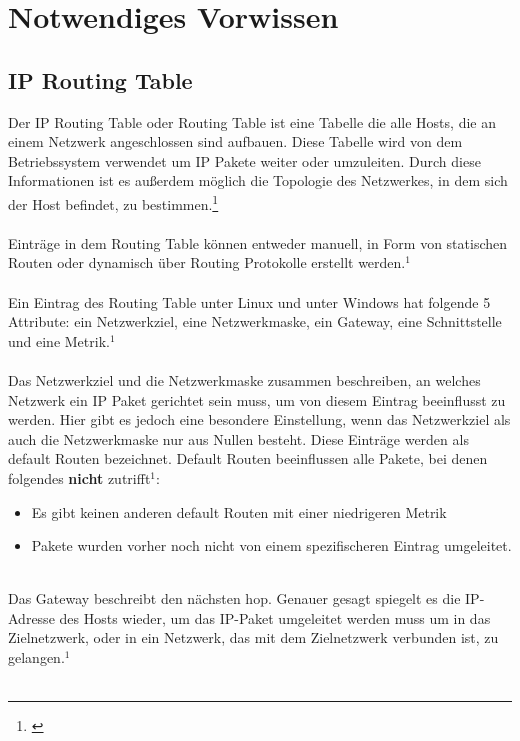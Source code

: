 \chapter{Notwendiges Vorwissen}
\label{cha:Notwendiges Vorwissen}

\section{IP Routing Table}
Der IP Routing Table oder Routing Table ist eine Tabelle die alle Hosts, die an einem Netzwerk angeschlossen sind aufbauen. Diese Tabelle wird von dem Betriebssystem verwendet um IP Pakete weiter oder umzuleiten. Durch diese Informationen ist es außerdem möglich die Topologie des Netzwerkes, in dem sich der Host befindet, zu bestimmen.\footnote[1]{\cite[Vgl.][]{2}}
\\\\
Einträge in dem Routing Table können entweder manuell, in Form von statischen Routen oder dynamisch über Routing Protokolle erstellt werden.$^{1}$
\\\\
Ein Eintrag des Routing Table unter Linux und unter Windows hat folgende 5 Attribute: ein Netzwerkziel, eine Netzwerkmaske, ein Gateway, eine Schnittstelle und eine Metrik.$^{1}$
\\\\
Das Netzwerkziel und die Netzwerkmaske zusammen beschreiben, an welches Netzwerk ein IP Paket gerichtet sein muss, um von diesem Eintrag beeinflusst zu werden. Hier gibt es jedoch eine besondere Einstellung, wenn das Netzwerkziel als auch die Netzwerkmaske nur aus Nullen besteht. Diese Einträge werden als default Routen bezeichnet. Default Routen beeinflussen alle Pakete, bei denen folgendes \textbf{nicht} zutrifft$^{1}$: 
\\
\begin{itemize}
    \item Es gibt keinen anderen default Routen mit einer niedrigeren Metrik
    \item Pakete wurden vorher noch nicht von einem spezifischeren Eintrag umgeleitet.
\end{itemize}
\ \\
Das Gateway beschreibt den nächsten hop. Genauer gesagt spiegelt es die IP-Adresse des Hosts wieder, um das IP-Paket umgeleitet werden muss um in das Zielnetzwerk, oder in ein Netzwerk, das mit dem Zielnetzwerk verbunden ist, zu gelangen.$^{1}$
\\\\
